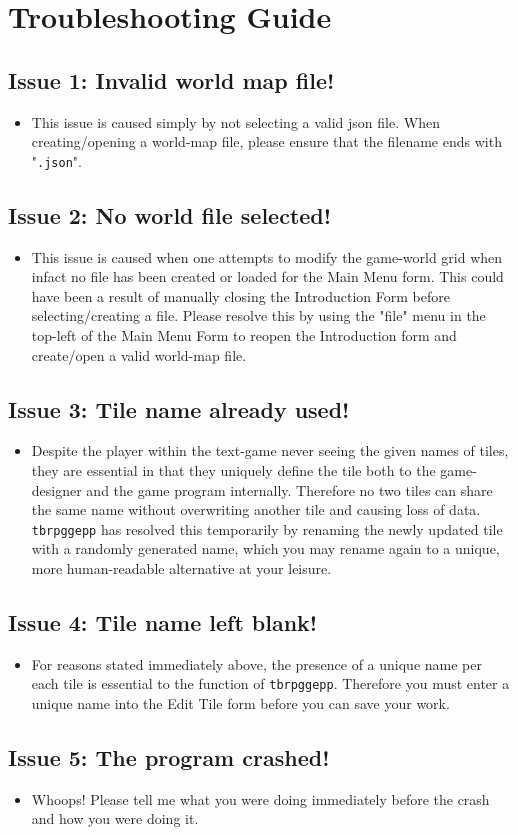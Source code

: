 \documentclass{article} \usepackage[margin=1in,headheight=57pt,headsep=0.1in]{geometry}
\begin{document}
\section{Troubleshooting Guide}
\subsection{Issue 1: Invalid world map file!}
\begin{itemize}
	\item This issue is caused simply by not selecting a valid json file. When creating/opening a world-map file, please ensure that the filename ends with "\texttt{.json}".
\end{itemize}
\subsection{Issue 2: No world file selected!}
\begin{itemize}
	\item This issue is caused when one attempts to modify the game-world grid when infact no file has been created or loaded for the Main Menu form. This could have been a result of manually closing the Introduction Form before selecting/creating a file. Please resolve this by using the "file" menu in the top-left of the Main Menu Form to reopen the Introduction form and create/open a valid world-map file.
\end{itemize}
\subsection{Issue 3: Tile name already used!}
\begin{itemize}
	\item Despite the player within the text-game never seeing the given names of tiles, they are essential in that they uniquely define the tile both to the game-designer and the game program internally. Therefore no two tiles can share the same name without overwriting another tile and causing loss of data. \texttt{tbrpggepp} has resolved this temporarily by renaming the newly updated tile with a randomly generated name, which you may rename again to a unique, more human-readable alternative at your leisure.
\end{itemize}
\subsection{Issue 4: Tile name left blank!}
\begin{itemize}
	\item For reasons stated immediately above, the presence of a unique name per each tile is essential to the function of \texttt{tbrpggepp}. Therefore you must enter a unique name into the Edit Tile form before you can save your work.
\end{itemize}
\subsection{Issue 5: The program crashed!}
\begin{itemize}
	\item Whoops! Please tell me what you were doing immediately before the crash and how you were doing it.
\end{itemize}
\end{document}
